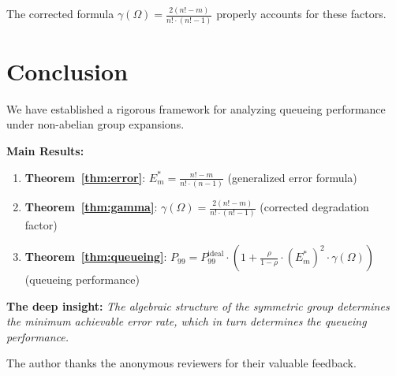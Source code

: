 \documentclass[11pt]{article}
\begin{document}
The corrected formula $\gamma(\Omega) = \frac{2(n! - m)}{n! \cdot (n! - 1)}$ properly accounts for these factors.

\section{Conclusion}

We have established a rigorous framework for analyzing queueing performance under non-abelian group expansions.

\textbf{Main Results:}
\begin{enumerate}
    \item \textbf{Theorem~\ref{thm:error}}: $E_m^* = \frac{n! - m}{n! \cdot (n-1)}$ (generalized error formula)
    \item \textbf{Theorem~\ref{thm:gamma}}: $\gamma(\Omega) = \frac{2(n! - m)}{n! \cdot (n! - 1)}$ (corrected degradation factor)
    \item \textbf{Theorem~\ref{thm:queueing}}: $P_{99} = P_{99}^{\text{ideal}} \cdot (1 + \frac{\rho}{1-\rho} \cdot (E_m^*)^2 \cdot \gamma(\Omega))$ (queueing performance)
\end{enumerate}

\textbf{The deep insight:} \textit{The algebraic structure of the symmetric group determines the minimum achievable error rate, which in turn determines the queueing performance.}

\begin{acks}
The author thanks the anonymous reviewers for their valuable feedback.
\end{acks}



\end{document}
